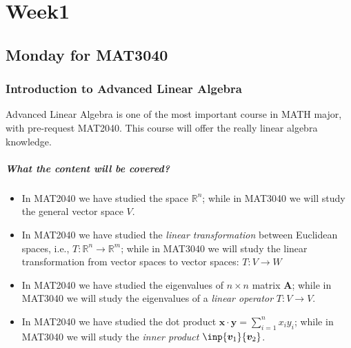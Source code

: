 
\chapter{Week1}

\section{Monday for MAT3040}

\subsection{Introduction to Advanced Linear Algebra}
Advanced Linear Algebra is one of the most important course in MATH major, with pre-request MAT2040. This course will offer the really linear algebra knowledge.
\paragraph{What the content will be covered?}
\begin{itemize}
\item
In MAT2040 we have studied the space $\mathbb{R}^n$; while in MAT3040 we will study the general vector space $V$. 
\item
In MAT2040 we have studied the \textit{linear transformation} between Euclidean spaces, i.e., $T:\mathbb{R}^n\to\mathbb{R}^m$; while in MAT3040 we will study the linear transformation from vector spaces to vector spaces: $T:V\to W$
\item
In MAT2040 we have studied the eigenvalues of $n\times n$ matrix $\bm A$; while in MAT3040 we will study the eigenvalues of a \emph{linear operator} $T:V\to V$.
\item
In MAT2040 we have studied the dot product $\bm x\cdot \bm y=\sum_{i=1}^nx_iy_i$; while in MAT3040 we will study the \emph{inner product} $\inp{\bm v_1}{\bm v_2}$.
\end{itemize}
